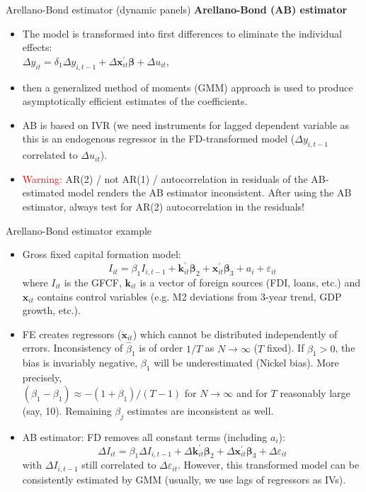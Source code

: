\documentclass[usenames,dvipsnames]{beamer}
\begin{document}
\begin{frame}{Arellano-Bond estimator (dynamic panels)}
\textbf{Arellano-Bond (AB) estimator} \\ \medskip
\begin{itemize}
\item The model is transformed into first differences to eliminate the individual effects:\\
$\Delta y_{it} = \delta_1 \Delta y_{i,t-1} + \Delta \bm{x}^{\prime}_{it} \bm{\beta} + \Delta u_{it}$, 
\medskip
\item then a generalized method of moments (GMM) approach is used to produce asymptotically efficient estimates of the coefficients.
\medskip
\item AB is based on IVR (we need instruments for lagged dependent variable as this is an endogenous regressor in the FD-transformed model ($\Delta y_{i,t-1}$ correlated to $\Delta u_{it}$).
\medskip
\item \textcolor{red}{Warning:} AR(2) / not AR(1) / autocorrelation in residuals of the AB-estimated model renders the AB estimator inconsistent. After using the AB estimator, always test for AR(2) autocorrelation in the residuals!
\end{itemize}
\end{frame}
\begin{frame}{Arellano-Bond estimator example}
\small
\begin{itemize}
\item Gross fixed capital formation model:
$$
I_{it} = \beta_1 I_{i,t-1} + \bm{k}_{it}^{\prime} \bm{\beta}_2  + \bm{x}_{it}^{\prime} \bm{\beta}_3 
+ a_i +\varepsilon_{it}
$$
where $I_{it}$ is the GFCF, $\bm{k}_{it}$ is a vector of foreign sources (FDI, loans, etc.) and $\bm{x}_{it}$ contains control variables (e.g. M2 deviations from 3-year trend, GDP growth, etc.). 
\smallskip
\item FE creates regressors ($\ddot{\bm{x}}_{it}$) which cannot be distributed independently of errors. Inconsistency of $\hat{\beta}_1$ is of order $1/T$ as $N \rightarrow \infty$ ($T$ fixed). If $\beta_1 > 0$, the bias is invariably negative, $\beta_1$ will be underestimated (Nickel bias). More precisely,\\ $(\hat{\beta}_1-\beta_1) \approx -(1 + \beta_1)/(T-1)$ for $N\rightarrow \infty$ and for $T$ reasonably large (say, 10). Remaining $\beta_j$ estimates are inconsistent as well.
\smallskip
\item AB estimator: FD removes all constant terms (including $a_i$):
$$
\Delta I_{it} = \beta_1 \Delta I_{i,t-1} + \Delta \bm{k}_{it}^{\prime} \bm{\beta}_2  + \Delta \bm{x}_{it}^{\prime} \bm{\beta}_3 
 + \Delta \varepsilon_{it}
$$
with $\Delta I_{i,t-1}$ still correlated to $\Delta \varepsilon_{it}$. However, this transformed model can be consistently estimated by GMM (usually, we use lags of regressors as IVs).
\end{itemize}
\end{frame}
\end{document}
